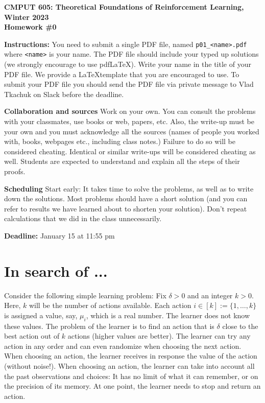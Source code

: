 \documentclass{article}
\newcommand{\hwnumber}{1}
\DeclareMathOperator*{\1}{\mathbbm{1}}
\begin{document}
\begin{center}
{\Large \textbf{CMPUT 605: Theoretical Foundations of Reinforcement Learning, Winter 2023\\ Homework \#0}}
\end{center}

\textbf{Instructions:}
You need to submit a single PDF file, named {\tt p0\hwnumber\_<name>.pdf} where {\tt <name>} is your name.
The PDF file should include your typed up solutions (we strongly encourage to use pdf\LaTeX). 
Write your name in the title of your PDF file.
We provide a \LaTeX template that you are encouraged to use.
To submit your PDF file you should send the PDF file via private message to Vlad Tkachuk on Slack before the deadline.

\textbf{Collaboration and sources}
Work on your own. You can consult the problems with your classmates, use books
or web, papers, etc.
Also, the write-up must be your own and you must acknowledge all the
sources (names of people you worked with, books, webpages etc., including class notes.) 
Failure to do so will be considered cheating.  
Identical or similar write-ups will be considered cheating as well.
Students are expected to understand and explain all the steps of their proofs.

\textbf{Scheduling}
Start early: It takes time to solve the problems, as well as to write down the solutions. Most problems should have a short solution (and you can refer to results we have learned about to shorten your solution). Don't repeat calculations that we did in the class unnecessarily.

\vspace{0.3cm}

\textbf{Deadline:} January 15 at 11:55 pm

\section{In search of ...}
\newcommand{\epssub}{\delta}
\newcommand{\cH}{\mathcal{H}}
\newcommand{\sA}{\mathcal{A}}
\newcommand{\cS}{\mathcal{S}}
\newcommand{\cA}{\mathcal{A}}
\newcommand{\cB}{\mathcal{B}}

Consider the following simple learning problem: 
Fix $\delta>0$ and an integer $k>0$.
Here, $k$ will be the number of actions available. Each action $i\in [k]:=\{1,\dots,k\}$ is assigned a value, say, $\mu_i$, which is a real number. The learner does not know these values.
The problem of the learner is to find an action that is $\delta$ close to the best action out of $k$ actions (higher values are better).
The learner can try any action in any order and can even randomize when choosing the next action.
When choosing an action, the learner receives in response the value of the action (without noise!).
When choosing an action, the learner can take into account all the past observations and choices: It has no limit of what it can remember, or on the precision of its memory.
At one point, the learner needs to stop and return an action.
\end{document}
